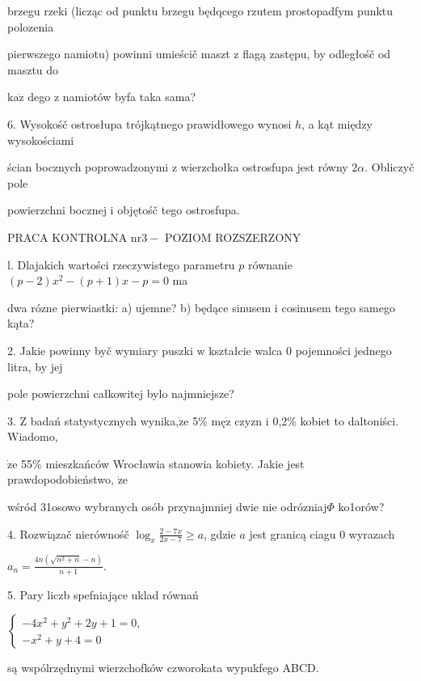 \documentclass[a4paper,12pt]{article}
\begin{document}
brzegu rzeki (licząc od punktu brzegu będqcego rzutem prostopadfym punktu polozenia

pierwszego namiotu) powinni umieścič maszt $\mathrm{z}$ flagą zastępu, by odległośč od masztu do

$\mathrm{k}\mathrm{a}\dot{\mathrm{z}}$ dego $\mathrm{z}$ namiotów byfa taka sama?

6. Wysokośč ostrosłupa trójkątnego prawidłowego wynosi $h$, a kąt między wysokościami

ścian bocznych poprowadzonymi $\mathrm{z}$ wierzchołka ostrosfupa jest równy $ 2\alpha$. Obliczyč pole

powierzchni bocznej $\mathrm{i}$ objętośč tego ostrosfupa.





PRACA KONTROLNA $\mathrm{n}\mathrm{r}3-$ POZIOM ROZSZERZONY

l. Dlajakich wartości rzeczywistego parametru $p$ równanie $(p-2)x^{2}-(p+1)x-p=0$ ma

dwa rózne pierwiastki: a) ujemne? b) będące sinusem $\mathrm{i}$ cosinusem tego samego kąta?

2. Jakie powinny byč wymiary puszki $\mathrm{w}$ kształcie walca $0$ pojemności jednego litra, by jej

pole powierzchni całkowitej bylo najmniejsze?

3. $\mathrm{Z}$ badań statystycznych wynika,$\dot{\mathrm{z}}\mathrm{e}$ 5\% $\mathrm{m}\text{ę}\dot{\mathrm{z}}$ czyzn $\mathrm{i}$ 0,2\% kobiet to daltoniści. Wiadomo,

$\dot{\mathrm{z}}\mathrm{e}$ 55\% mieszkańców Wrocławia stanowia kobiety. Jakie jest prawdopodobieństwo, $\dot{\mathrm{z}}\mathrm{e}$

wśród 31osowo wybranych osób przynajmniej dwie nie odrózniaj$\Phi$ ko1orów?

4. Rozwiązač nierównośč $\displaystyle \log_{x}\frac{2-7x}{2x-7}\geq a$, gdzie $a$ jest granicą ciagu $0$ wyrazach

$a_{n}=\displaystyle \frac{4n(\sqrt{n^{2}+n}-n)}{n+1}.$

5. Pary liczb spefniające uklad równań

$\left\{\begin{array}{l}
-4x^{2}+y^{2}+2y+1=0,\\
-x^{2}+y+4=0
\end{array}\right.$

są wspólrzędnymi wierzchofków czworokata wypukfego ABCD.
\end{document}
